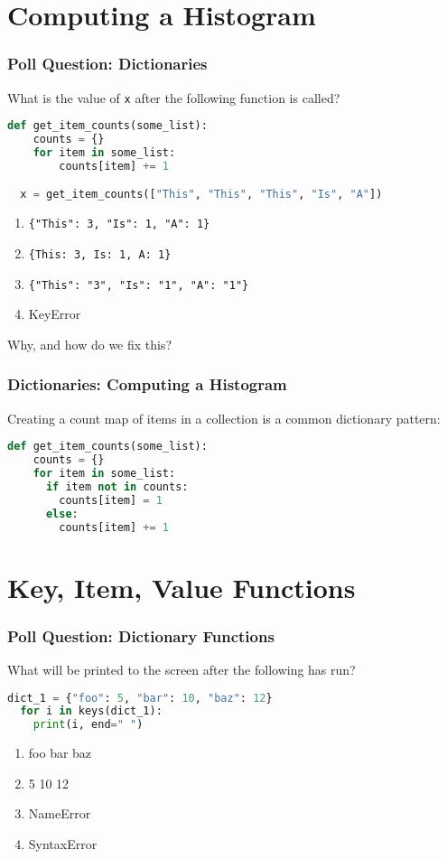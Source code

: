 \documentclass{beamer}
\begin{document}
%
%
\section{Computing a Histogram}
\begin{frame}[fragile]
  \frametitle{Poll Question: Dictionaries}
  What is the value of \lstinline|x| after the following function is called?
  \begin{lstlisting}[language=Python, autogobble]
  def get_item_counts(some_list):
    counts = {}
    for item in some_list:
        counts[item] += 1

  x = get_item_counts(["This", "This", "This", "Is", "A"])
  \end{lstlisting}
  \vfill
  \begin{enumerate}
    \item \lstinline|{"This": 3, "Is": 1, "A": 1}|
    \item \lstinline|{This: 3, Is: 1, A: 1}|
    \item \lstinline|{"This": "3", "Is": "1", "A": "1"}|
    \item KeyError
  \end{enumerate}
  \pause
  Why, and how do we fix this?
\end{frame}

%
%
\begin{frame}[fragile]
  \frametitle{Dictionaries: Computing a Histogram}
  Creating a count map of items in a collection is a common dictionary pattern:
  \begin{lstlisting}[language=Python, autogobble]
  def get_item_counts(some_list):
    counts = {}
    for item in some_list:
      if item not in counts:
        counts[item] = 1
      else:
        counts[item] += 1
  \end{lstlisting}
\end{frame}

%
%
\section{Key, Item, Value Functions}
\begin{frame}[fragile]
  \frametitle{Poll Question: Dictionary Functions}
  What will be printed to the screen after the following has run?
  \begin{lstlisting}[language=Python, autogobble]
  dict_1 = {"foo": 5, "bar": 10, "baz": 12}
  for i in keys(dict_1):
    print(i, end=" ")
  \end{lstlisting}
  \vfill
  \begin{enumerate}[A]
    \item foo bar baz
    \item 5 10 12 
    \item NameError
    \item SyntaxError
  \end{enumerate}
\end{frame}
\end{document}
